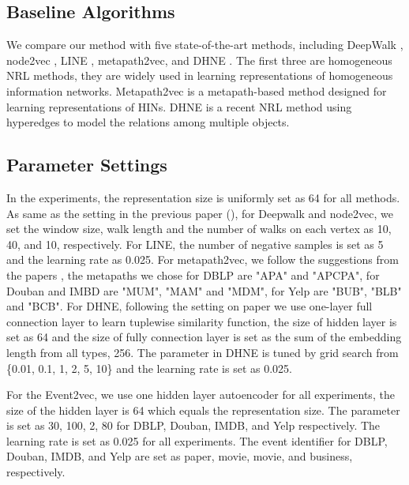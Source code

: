 \subsection{Baseline Algorithms}
We compare our method with five state-of-the-art methods, including DeepWalk \cite{perozzi2014deepwalk}, node2vec \cite{grover2016node2vec}, LINE \cite{tang2015line}, metapath2vec\cite{dong2017metapath2vec}, and DHNE \cite{tu2017structural}. The first three are homogeneous NRL methods, they are widely used in learning representations of homogeneous information networks. Metapath2vec is a metapath-based method designed for learning representations of HINs. DHNE is a recent NRL method using hyperedges to model the relations among multiple objects.

\subsection{Parameter Settings}
In the experiments, the representation size is uniformly set as 64 for all methods. As same as the setting in the previous paper (\cite{tu2017structural}), for Deepwalk and node2vec, we set the window size, walk length and the number of walks on each vertex as 10, 40, and 10, respectively. For LINE, the number of negative samples is set as 5 and the learning rate as 0.025. For metapath2vec, we follow the suggestions from the papers \cite{dong2017metapath2vec,zheng2017recommendation}, the metapaths we chose for DBLP are "APA" and "APCPA", for Douban and IMBD are "MUM", "MAM" and "MDM", for Yelp are "BUB", "BLB" and "BCB". For DHNE, following the setting on paper \cite{tu2017structural} we use one-layer full connection layer to learn tuplewise similarity function, the size of hidden layer is set as 64 and the size of fully connection layer is set as the sum of the embedding length from all types, 256. The parameter  in DHNE is tuned by grid search from \{0.01, 0.1, 1, 2, 5, 10\} and the learning rate is set as 0.025.

For the Event2vec, we use one hidden layer autoencoder for all experiments, the size of the hidden layer is 64 which equals the representation size. The parameter  is set as 30, 100, 2, 80 for DBLP, Douban, IMDB, and Yelp respectively. The learning rate is set as 0.025 for all experiments. The event identifier for DBLP, Douban, IMDB, and Yelp are set as paper, movie, movie, and business, respectively.


